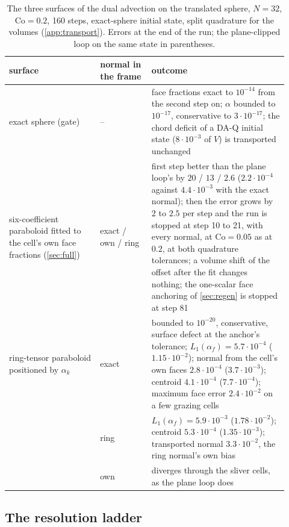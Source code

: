 \begin{table}[htbp]
\centering
\caption{The three surfaces of the dual advection on the translated sphere, $N = 32$, $\mathrm{Co} = 0.2$, 160 steps, exact-sphere initial state, split quadrature for the volumes (\ref{app:transport}). Errors at the end of the run; the plane-clipped loop on the same state in parentheses.}
\label{tab:tpf-surfaces}
\footnotesize
\begin{tabular}{p{0.30\linewidth}p{0.17\linewidth}p{0.45\linewidth}}
\toprule
surface & normal in the frame & outcome \\
\midrule
exact sphere (gate) & -- & face fractions exact to $10^{-14}$ from the second step on; $\alpha$ bounded to $10^{-17}$, conservative to $3\cdot10^{-17}$; the chord deficit of a DA-Q initial state ($8\cdot10^{-3}$ of $V$) is transported unchanged \\
\midrule
six-coefficient paraboloid fitted to the cell's own face fractions (\cref{sec:full}) & exact / own / ring & first step better than the plane loop's by $20$ / $13$ / $2.6$ ($2.2\cdot10^{-4}$ against $4.4\cdot10^{-3}$ with the exact normal); then the error grows by $2$ to $2.5$ per step and the run is stopped at step 10 to 21, with every normal, at $\mathrm{Co} = 0.05$ as at $0.2$, at both quadrature tolerances; a volume shift of the offset after the fit changes nothing; the one-scalar face anchoring of \cref{sec:regen} is stopped at step 81 \\
\midrule
ring-tensor paraboloid positioned by $\alpha_k$ & exact & bounded to $10^{-20}$, conservative, surface defect at the anchor's tolerance; $L_1(\alpha_f) = 5.7\cdot10^{-4}$ ($1.15\cdot10^{-2}$); normal from the cell's own faces $2.8\cdot10^{-4}$ ($3.7\cdot10^{-3}$); centroid $4.1\cdot10^{-4}$ ($7.7\cdot10^{-4}$); maximum face error $2.4\cdot10^{-2}$ on a few grazing cells \\
 & ring & $L_1(\alpha_f) = 5.9\cdot10^{-3}$ ($1.78\cdot10^{-2}$); centroid $5.3\cdot10^{-4}$ ($1.35\cdot10^{-3}$); transported normal $3.3\cdot10^{-2}$, the ring normal's own bias \\
 & own & diverges through the sliver cells, as the plane loop does \\
\bottomrule
\end{tabular}
\end{table}

\subsection{The resolution ladder}
\label{sec:tpf-ladder}

